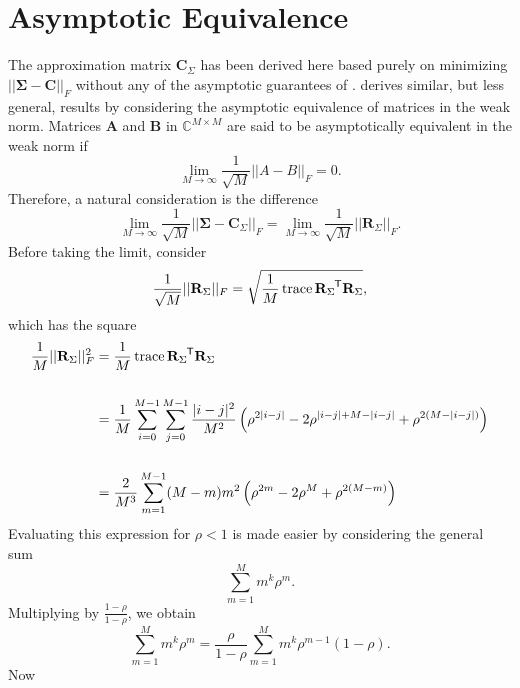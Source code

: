 \documentclass[letterpaper,12pt,oneside,final]{article}
\newcommand{\m}[1]{\mathbf{#1}}               %
\newcommand{\sm}[1]{\boldsymbol{#1}}   %
\newcommand{\tr}[1]{{#1}^{\mkern-1.5mu\mathsf{T}}}              %
\newcommand{\norm}[1]{||{#1}||}              %
\newcommand{\frob}[1]{\norm{#1}_F}
\newcommand{\abs}[1]{\lvert{#1}\rvert}              %
\newcommand*{\trace}{\operatorname{trace}}
\newcommand{\field}[1]{\mathbb{#1}}
\newcommand{\Complex}{\field{C}}
\begin{document}
\section{Asymptotic Equivalence} \label{c:multipleTesting:asympEquiv}

The approximation matrix $\m{C}_{\Sigma}$ has been derived here based purely on minimizing $\frob{\sm{\Sigma} - \m{C}}$ without any of the asymptotic guarantees of \cite{grenanderszego1958}. \cite{gray2006toeplitz} derives similar, but less general, results by considering the asymptotic equivalence of matrices in the weak norm. Matrices $\m{A}$ and $\m{B}$ in $\Complex^{M \times M}$ are said to be asymptotically equivalent in the weak norm if
$$\lim_{M \rightarrow \infty} \frac{1}{\sqrt{M}} \frob{A - B} = 0.$$
Therefore, a natural consideration is the difference
\begin{equation} \label{eq:multipleTesting:asympEq}
  \lim_{M \rightarrow \infty} \frac{1}{\sqrt{M}} \frob{\sm{\Sigma} - \m{C}_{\Sigma}} = \lim_{M \rightarrow \infty} \frac{1}{\sqrt{M}} \frob{\m{R}_{\Sigma}}.
\end{equation}
Before taking the limit, consider
$$\frac{1}{\sqrt{M}} \frob{\m{R}_{\Sigma}} =  \sqrt{ \frac{1}{M} \trace{\tr{\m{R}_{\Sigma}} \m{R}_{\Sigma}} },$$
which has the square
\begin{equation} \label{eq:multipleTesting:asymTrace}
  \begin{aligned}
    \frac{1}{M} \frob{\m{R}_{\Sigma}}^2 & =  \frac{1}{M} \trace{\tr{\m{R}_{\Sigma}} \m{R}_{\Sigma}} \\
    & \\
    & = \frac{1}{M} \sum_{i = 0}^{M-1} \sum_{j = 0}^{M-1} \frac{\abs{i-j}^2}{M^2} \left ( \rho^{2\abs{i-j}} - 2 \rho^{\abs{i-j} + M - \abs{i-j}} + \rho^{2(M - \abs{i-j})} \right ) \\
    & \\
    & =  \frac{2}{M^3} \sum_{m = 1}^{M-1} (M-m) m^2 \left ( \rho^{2m} - 2 \rho^{M} + \rho^{2(M - m)} \right )
  \end{aligned}
\end{equation}
Evaluating this expression for $\rho < 1$ is made easier by considering the general sum
$$\sum_{m = 1}^{M} m^k \rho^m.$$
Multiplying by $\frac{1 - \rho}{1 - \rho}$, we obtain
$$\sum_{m = 1}^{M} m^k \rho^m = \frac{\rho}{1 - \rho} \sum_{m = 1}^{M} m^k \rho^{m-1} (1 - \rho).$$
Now
\end{document}
